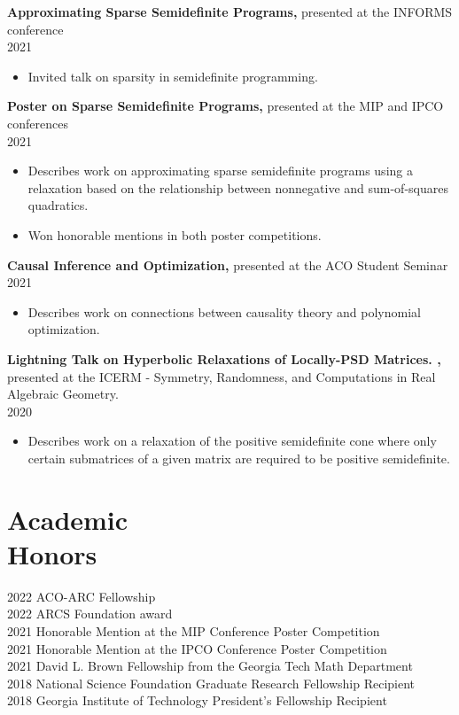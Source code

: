 \documentclass[margin]{res}
\begin{document}
\begin{resume}
{\bf  Approximating Sparse Semidefinite Programs,} presented at the INFORMS conference \\ 2021 
\begin{itemize} \itemsep -2pt %
\item Invited talk on sparsity in semidefinite programming.
\end{itemize}


{\bf  Poster on Sparse Semidefinite Programs,} presented at the MIP and IPCO conferences \\ 2021 
\begin{itemize} \itemsep -2pt %
\item Describes work on approximating sparse semidefinite programs using a relaxation based on the relationship between nonnegative and sum-of-squares quadratics.
\item Won honorable mentions in both poster competitions.
\end{itemize}

{\bf  Causal Inference and Optimization,} presented at the ACO Student Seminar \\ 2021
\begin{itemize} \itemsep -2pt %
\item Describes work on connections between causality theory and polynomial optimization.
\end{itemize}

{\bf  Lightning Talk on Hyperbolic Relaxations of Locally-PSD Matrices.
,} 
presented at the ICERM - Symmetry, Randomness, and Computations in Real Algebraic Geometry.
 \\ 2020
\begin{itemize} \itemsep -2pt %
\item Describes work on a relaxation of the positive semidefinite cone where only certain submatrices of a given matrix are required to be positive semidefinite.
\end{itemize}



\section{Academic \\ Honors} 
2022 ACO-ARC Fellowship\\
2022 ARCS Foundation award\\
2021 Honorable Mention at the MIP Conference Poster Competition\\
2021 Honorable Mention at the IPCO Conference Poster Competition\\
2021 David L. Brown Fellowship from the Georgia Tech Math Department\\
2018 National Science Foundation Graduate Research Fellowship Recipient\\
2018 Georgia Institute of Technology President's Fellowship Recipient


\end{resume}
\end{document}
